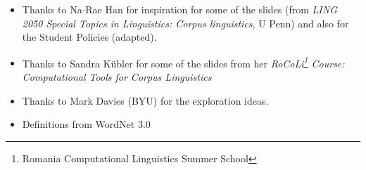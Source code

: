 \documentclass[a4paper,landscape,headrule,footrule,xetex]{foils}
\begin{document}


\begin{itemize}
\item Thanks to Na-Rae Han for 
  inspiration for some of the slides (from  \textit{LING 2050 Special Topics in Linguistics: Corpus linguistics}, U Penn) and also for the Student Policies (adapted).
\item Thanks to Sandra K\"{u}bler for some of the slides from her 
\textit{RoCoLi\footnote{Romania Computational Linguistics Summer School} Course: Computational Tools for Corpus Linguistics}
\item Thanks to Mark Davies (BYU) for the exploration ideas.
\item Definitions from WordNet 3.0
\end{itemize}


\small


\end{document}

